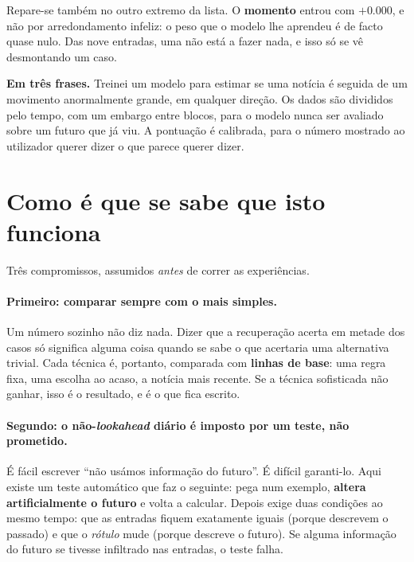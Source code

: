 Repare-se também no outro extremo da lista. O \textbf{momento} entrou com $+0.000$, e não por
arredondamento infeliz: o peso que o modelo lhe aprendeu é de facto quase nulo. Das nove entradas,
uma não está a fazer nada, e isso só se vê desmontando um caso.

\begin{tcolorbox}[colback=black!3, colframe=black!30, boxrule=0.4pt, arc=2pt]
\textbf{Em três frases.} Treinei um modelo para estimar se uma notícia é seguida de um movimento
anormalmente grande, em qualquer direção. Os dados são divididos pelo tempo, com um embargo entre
blocos, para o modelo nunca ser avaliado sobre um futuro que já viu. A pontuação é calibrada, para o
número mostrado ao utilizador querer dizer o que parece querer dizer.
\end{tcolorbox}

\section{Como é que se sabe que isto funciona}
\label{sec:met_avaliacao}

Três compromissos, assumidos \emph{antes} de correr as experiências.

\paragraph{Primeiro: comparar sempre com o mais simples.}
Um número sozinho não diz nada. Dizer que a recuperação acerta em metade dos casos só significa
alguma coisa quando se sabe o que acertaria uma alternativa trivial. Cada técnica é, portanto,
comparada com \textbf{linhas de base}: uma regra fixa, uma escolha ao acaso, a notícia mais
recente. Se a técnica sofisticada não ganhar, isso é o resultado, e é o que fica escrito.

\paragraph{Segundo: o não-\emph{lookahead} diário é imposto por um teste, não prometido.}
É fácil escrever ``não usámos informação do futuro''. É difícil garanti-lo. Aqui existe um teste
automático que faz o seguinte: pega num exemplo, \textbf{altera artificialmente o futuro} e volta a
calcular. Depois exige duas condições ao mesmo tempo: que as entradas fiquem exatamente
iguais (porque descrevem o passado) e que o \emph{rótulo} mude (porque descreve o futuro). Se
alguma informação do futuro se tivesse infiltrado nas entradas, o teste falha.

